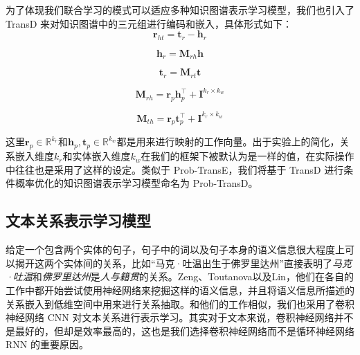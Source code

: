 为了体现我们联合学习的模式可以适应多种知识图谱表示学习模型，我们也引入了 TransD 来对知识图谱中的三元组进行编码和嵌入，具体形式如下：
\begin{equation}
\textbf{r}_{ht} = \textbf{t}_{r} - \textbf{h}_{r}
\end{equation}

\begin{equation}
\textbf{h}_{r} = \textbf{M}_{rh}\textbf{h}
\end{equation}

\begin{equation}
\textbf{t}_{r} = \textbf{M}_{rt}\textbf{t}
\end{equation}

\begin{equation}
\textbf{M}_{rh} = \textbf{r}_p\textbf{h}_p^{\top}+\textbf{I}^{k_r \times k_w}
\end{equation}

\begin{equation}
\textbf{M}_{th} = \textbf{r}_p\textbf{t}_p^{\top}+\textbf{I}^{k_r \times k_w}
\end{equation}

这里$\textbf{r}_p \in \mathbb{R}^{k_r} $和$\textbf{h}_p, \textbf{t}_p \in \mathbb{R}^{k_w}$都是用来进行映射的工作向量。出于实验上的简化，关系嵌入维度$k_r$和实体嵌入维度$k_w$在我们的框架下被默认为是一样的值，在实际操作中往往也是采用了这样的设定。类似于 Prob-TransE，我们将基于 TransD 进行条件概率优化的知识图谱表示学习模型命名为 Prob-TransD。

\subsection{文本关系表示学习模型}
\label{sec3:relation}

给定一个包含两个实体的句子，句子中的词以及句子本身的语义信息很大程度上可以揭开这两个实体间的关系，比如``马克·吐温出生于佛罗里达州''直接表明了\emph{马克·吐温}和\emph{佛罗里达州}是\emph{人与籍贯}的关系。Zeng、Toutanova以及Lin\cite{zeng2014relation,toutanova2015representing,lin2016neural}，他们在各自的工作中都开始尝试使用神经网络来挖掘这样的语义信息，并且将语义信息所描述的关系嵌入到低维空间中用来进行关系抽取。和他们的工作\cite{zeng2014relation,toutanova2015representing,lin2016neural}相似，我们也采用了卷积神经网络 CNN 对文本关系进行表示学习。其实对于文本来说，卷积神经网络并不是最好的，但却是效率最高的，这也是我们选择卷积神经网络而不是循环神经网络 RNN 的重要原因。


